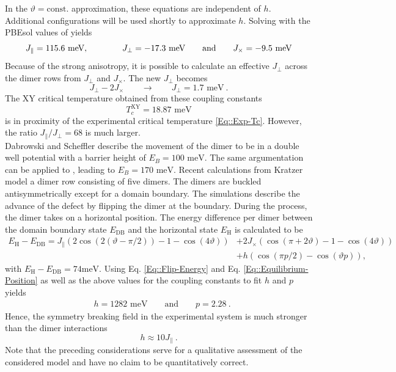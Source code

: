 	In the $\vartheta =	\text{const.}$ approximation, these equations are independent of $h$. Additional configurations will be used shortly to approximate $h$.
	Solving with the PBEsol values of \cite{brand2023critical} yields
	\begin{equation}
		J_\parallel =	115.6 \text{ meV} , \qquad \qquad J_\perp =	-17.3 \text{ meV} \qquad \text{and} \qquad J_\times =	-9.5 \text{ meV} \\		
	\end{equation}
	Because of the strong anisotropy, it is possible to calculate an effective $J_\perp$ across the dimer rows from $J_\perp$ and $J_\times$. The new $J_\perp$ becomes 
	\begin{equation}
		J_\perp - 2 J_\times \qquad \rightarrow  \qquad J_\perp =	1.7 \text{ meV} ~.
	\end{equation}
	The XY critical temperature obtained from these coupling constants 
	\begin{equation}
		T_c^{\text{XY}} =	18.87 \text{ meV}
	\end{equation}
	is in proximity of the experimental critical temperature \eqref{Eq::Exp-Tc}. However, the ratio $J_\parallel /	J_\perp = 68$ is much larger.\\
	
	Dabrowski and Scheffler \cite{dabrowski1992self} describe the movement of the dimer to be in a double well potential with a barrier height of $E_B =	100 \text{ meV}$. The same argumentation can be applied to \cite{inoue1994order}, leading to $E_B =	170 \text{ meV}$. Recent calculations from Kratzer \cite{kratzer2024flip} model a dimer row consisting of five dimers. The dimers are buckled antisymmetrically  except for a domain boundary. The simulations describe the advance of the defect by flipping the dimer at the boundary. During the process, the dimer takes on a horizontal position. The energy difference per dimer between the domain boundary state $E_{\text{DB}}$ and the horizontal state $E_\text{H}$ is calculated to be 
	\begin{equation} \label{Eq::Flip-Energy}
		\begin{split}
			E_\text{H} - E_{\text{DB}} = J_\parallel \left(2 \cos ( 2 (\vartheta - \pi / 2)) -1 - \cos(4 \vartheta)\right) &+ 2 J_\times \left(\cos(\pi + 2 \vartheta) - 1 - \cos(4 \vartheta) \right) \\
			&+ h \left(\cos(\pi p /	2) - \cos(\vartheta p)\right),
		\end{split}
	\end{equation}
	with $E_\text{H} - E_\text{DB} =	74 \text{meV}$. Using Eq. \eqref{Eq::Flip-Energy} and Eq. \eqref{Eq::Equilibrium-Position} as well as the above values for the coupling constants  to fit $h$ and $p$ yields
	\begin{align}
		&h =	1282 \text{ meV} \qquad \text{and} \qquad p =	2.28~.
	\end{align}
	Hence, the symmetry breaking field in the experimental system is much stronger than the dimer interactions 
	\begin{equation} \label{Eq::h-J-ratio}
		h \approx 10 J_\parallel~.
	\end{equation}
	Note that the preceding considerations serve for a qualitative assessment of the considered model and have no claim to be quantitatively correct.

